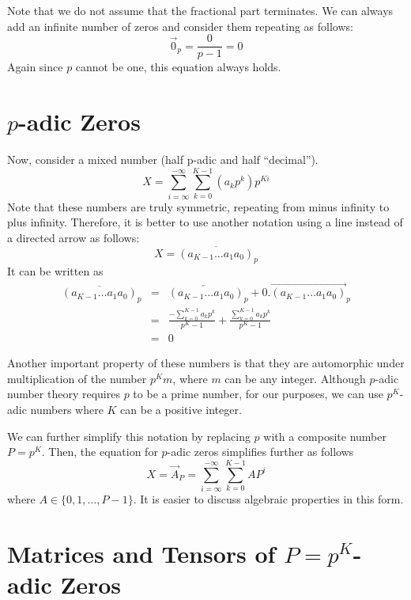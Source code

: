 \documentclass[times,twocolumn,final]{elsarticle}
\begin{document}
Note that we do not assume that the fractional part terminates. We can always add an infinite number of zeros and consider them repeating as follows:
$$
\overrightarrow{0}_p =\frac{0}{p-1} = 0
$$
Again since $p$ cannot be one, this equation always holds. 

\section{$p$-adic Zeros}
\label{sec_appendix_padic_zero}

Now, consider a mixed number (half p-adic and half ``decimal''). 
\begin{equation}
X = \sum_{i=\infty}^{-\infty} \sum_{k=0}^{K-1} (a_k p^k) p^{Ki} \label{Eq_padic_zero}
\end{equation} 
Note that these numbers are truly symmetric, repeating from minus infinity to plus infinity. Therefore, it is better to use another notation using a line instead of a directed arrow as follows: 
\begin{equation}
X=\overline{(a_{K-1}\ldots a_1 a_0)}_p
\end{equation}
It can be written as 
\begin{eqnarray}
\overline{(a_{K-1}\ldots a_1 a_0)}_p &=&\overleftarrow{(a_{K-1}\ldots a_1 a_0)}_p + 0. \overrightarrow{(a_{K-1}\ldots a_1 a_0)}_p \nonumber\\
&=&  \frac{\displaystyle -\sum_{k=0}^{K-1} a_k p^k}{p^K-1}  +  \frac{\displaystyle \sum_{k=0}^{K-1} a_k p^k}{p^K-1} \nonumber \\ 
&=& 0 \label{Eq_zero}
\end{eqnarray}

Another important property of these numbers is that they are automorphic under multiplication of the number $p^Km$, where $m$ can be any integer.  Although $p$-adic number theory requires $p$ to be a prime number, for our purposes, we can use $p^K$-adic numbers where $K$ can be a positive integer. 

We can further simplify this notation by replacing $p$ with a composite number $P=p^K$. Then, the equation for $p$-adic zeros  simplifies further as follows 
\begin{equation}
X =  \overrightarrow{A}_P = \sum_{i=\infty}^{-\infty} \sum_{k=0}^{K-1} A P^{i}
\end{equation} 
where $A \in \{0,1,\ldots,P-1\}.$
It is easier to discuss algebraic properties in this form. 


\section{Matrices and Tensors of $P=p^K$-adic Zeros}
\label{sec_appendix_padic_tensors}
\end{document}
